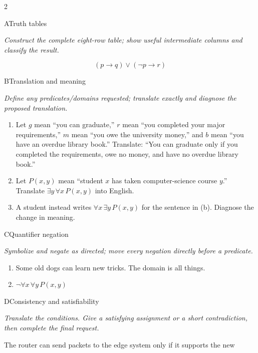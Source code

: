\documentclass[9pt]{extarticle}
\begin{document}
\CoreWorkArea
\FormBreak
{}
\begin{multicols}{2}
\begin{CoreProblem}{A}{Truth tables}
{\scriptsize\textit{Construct the complete eight-row table; show useful intermediate columns and classify the result.}\par}
\[
  (p\to q)\lor(\neg p\to r)
\]
\end{CoreProblem}
\begin{CoreProblem}{B}{Translation and meaning}
{\scriptsize\textit{Define any predicates/domains requested; translate exactly and diagnose the proposed translation.}\par}
\begin{enumerate}[label=(\alph*)]
  \item Let $g$ mean ``you can graduate,'' $r$ mean ``you completed your major
        requirements,'' $m$ mean ``you owe the university money,'' and $b$
        mean ``you have an overdue library book.'' Translate: ``You can
        graduate only if you completed the requirements, owe no money, and
        have no overdue library book.''
  \item Let $P(x,y)$ mean ``student $x$ has taken computer-science course
        $y$.'' Translate $\exists y\,\forall x\,P(x,y)$ into English.
  \item A student instead writes $\forall x\,\exists y\,P(x,y)$ for the
        sentence in (b). Diagnose the change in meaning.
\end{enumerate}
\end{CoreProblem}
\begin{CoreProblem}{C}{Quantifier negation}
{\scriptsize\textit{Symbolize and negate as directed; move every negation directly before a predicate.}\par}
\begin{enumerate}[label=(\alph*)]
  \item Some old dogs can learn new tricks. The domain is all things.
  \item $\neg\forall x\,\forall y\,P(x,y)$
\end{enumerate}
\end{CoreProblem}
\columnbreak
\begin{CoreProblem}{D}{Consistency and satisfiability}
{\scriptsize\textit{Translate the conditions. Give a satisfying assignment or a short contradiction, then complete the final request.}\par}
The router can send packets to the edge system only if it supports the new

\end{CoreProblem}
\end{multicols}
\end{document}
